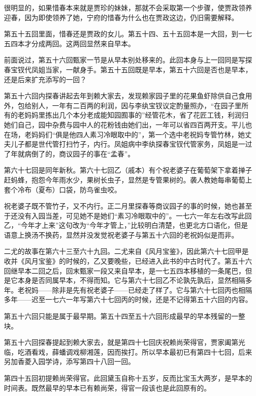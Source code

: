 \par 很明显的，如果惜春本来就是贾珍的妹妹，那就不会采取第一个步骤，使贾政领养迎春，因为即使领养了她，宁府的惜春为什么也在贾政这边，仍旧需要解释。
\par 第五十五回里面，惜春还是贾政的女儿。第五十四、五十五回本是一大回，到一七五四本才分成两回。这两回显然来自早本。
\par 前面说过，第五十六回甄家一节是从早本别处移来的。此回本身与上一回同是写探春宝钗代凤姐当家，一献身手。第五十五回既是早本，第五十六回是否也是早本，还是后来扩充添写的一回？
\par 第五十六回内探春讲起去年到赖大家去，发现赖家园子里的花果鱼虾除供自己食用外，包给别人，一年有二百两的利润，因与李纨宝钗议定酌量照办，“在园子里所有的老妈妈里拣出几个本分老成能知园囿事的”经管花木，省了花匠工钱，利润归她们自己，园中杂费与园中人的花粉钱由她们出，一年可以省四百两开支。平儿也在场，老妈妈们“俱是他四人素习冷眼取中的”，第一个选中老祝妈专管竹林，她丈夫儿子都是世代管打扫竹子，内行。凤姐病中李纨探春宝钗代管家务，凤姐是一过了年就病倒了的，商议园子的事在“孟春”。
\par 第六十七回是同年新秋。第六十七回乙（戚本）有个祝老婆子在葡萄架下拿着掸子赶蚂蜂，抱怨今年雨水少，果树长虫子，显然是专管果树的。袭人教她每串葡萄上套个冷布（夏布）口袋，防鸟雀虫咬。
\par 祝老婆子既不管竹子，又不内行。正二月里探春等商议园子的事的时候，她也甚至于还没有入园当差，可见她不是她们“素习冷眼取中的”。一七六一年左右改写此回乙，“今年才上来”这句改为“今年才管上，”比较明白清楚，也更北方口语化，但是语意上换汤不换药，显然并没发觉祝老婆子与第五十六回的老祝妈似是而非。
\par 二尤的故事在第六十三至六十九回。二尤来自《风月宝鉴》，因此第六十七回甲是收并《风月宝鉴》的时候的，乙又要晚些，已经进入此书的中古时代了。第五十六回继早本二回之后，回末甄家一段又来自早本，是一七五四本移植的一条尾巴，但是它本身是否同属早本，不得而知。它与第六十七回乙不论孰先孰后，显然相隔多年。老祝妈——除非是先有祝老婆子——已经走了样了。它与第六十七回丙也相隔多年——迟至一七六一年写第六十七回丙的时候，还是不记得第五十六回的内容。
\par 第五十六回只能是属于最早期。第五十四至五十六回形成最早的早本残留的一整块。
\par 第五十六回探春提起到赖大家去，就是第四十七回庆祝赖尚荣得官，贾家阖第光临，吃酒看戏，薛蟠调戏柳湘莲，因而挨打。所以早本最初已有第四十七回，后来另加香菱入园学诗，添写第四十八回一回。
\par 第四十五回初提赖尚荣得官。此回黛玉自称十五岁，反而比宝玉大两岁，是早本的时间表。既然最早的早本已有赖尚荣，得官一段该也是此回原有的。
